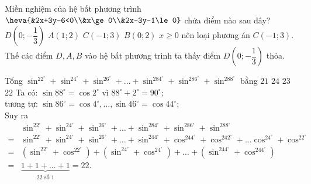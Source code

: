 \begin{ex}%
	Miền nghiệm của hệ bất phương trình $\heva{&2x+3y-6<0\\&x\ge 0\\&2x-3y-1\le 0}$ chứa điểm nào sau đây?
	\choice 
	{\True $D\left(0;-\dfrac{1}{3}\right)$}
	{$A(1;2)$}
	{$C(-1;3)$}
	{$B(0;2)$}
	\loigiai 
	{$x \geq 0$ nên loại phương án $C(-1;3)$.\\
		Thế các điểm $D, A, B$ vào hệ bất phương trình ta thấy điểm $D\left(0;-\dfrac{1}{3}\right)$ thỏa.
	}
\end{ex}

\begin{ex}%
	Tổng $\sin^22^\circ+\sin^24^\circ+\sin^26^\circ+\ldots+\sin^284^\circ+\sin^286^\circ+\sin^288^\circ$ bằng 
	\choice 
	{$21$}
	{$24$}
	{$23$}
	{\True $22$}
	\loigiai 
	{ Ta có: $\sin{88^\circ}=\cos{2^\circ}$ vì $88^\circ + 2^\circ = 90^\circ$; \\
		tương tự: $\sin{86^\circ}=\cos{4^\circ}, \ldots, \sin{46^\circ}=\cos{44^\circ}$; \\
		Suy ra
		\begin{align*}
			&\sin^22^\circ+\sin^24^\circ+\sin^26^\circ+\ldots+\sin^284^\circ+\sin^286^\circ+\sin^288^\circ\\
			=&\sin^22^\circ+\sin^24^\circ+\sin^26^\circ+\ldots+\sin^244^\circ+\cos^244^\circ+\cos^242^\circ + \ldots \cos^24^\circ + \cos^22^\circ\\
			=&\left(\sin^22^\circ+\cos^22^\circ\right)+\left(\sin^24^\circ + \cos^24^\circ\right)+\ldots
			+\left(\sin^244^\circ+\cos^244^\circ\right)\\
			=&\underbrace{1+1+...+1}_{22 \text{ số } 1}=22.
		\end{align*}
	}
\end{ex}
